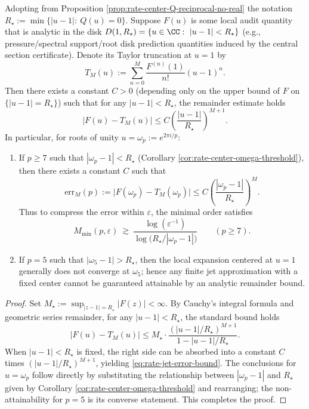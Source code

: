 \begin{proposition}\label{prop:rate-center-Rstar-jet-complexity}
Adopting from Proposition \ref{prop:rate-center-Q-reciprocal-no-real} the notation
\(
R_\star:=\min\{|u-1|:\ Q(u)=0\}
\).
Suppose \(F(u)\) is some local audit quantity that is analytic in the disk
\(
D(1,R_\star)=\{u\in\CC:\ |u-1|<R_\star\}
\)
(e.g., pressure/spectral support/root disk prediction quantities induced by the central section certificate).
Denote its Taylor truncation at \(u=1\) by
\[
T_M(u):=\sum_{n=0}^{M}\frac{F^{(n)}(1)}{n!}(u-1)^n.
\]
Then there exists a constant \(C>0\) (depending only on the upper bound of \(F\) on \(\{|u-1|=R_\star\}\)) such that for any \(|u-1|<R_\star\), the remainder estimate holds
\begin{equation}\label{eq:rate-jet-error-bound}
\boxed{\;
\bigl|F(u)-T_M(u)\bigr|
\le
C\left(\frac{|u-1|}{R_\star}\right)^{M+1}. \;}
\end{equation}
In particular, for roots of unity \(u=\omega_p:=e^{2\pi i/p}\):
\begin{enumerate}
  \item If \(p\ge 7\) such that \(|\omega_p-1|<R_\star\) (Corollary \ref{cor:rate-center-omega-threshold}), then there exists a constant \(C\) such that
  \[
  \mathrm{err}_M(p):=\bigl|F(\omega_p)-T_M(\omega_p)\bigr|
  \le
  C\left(\frac{|\omega_p-1|}{R_\star}\right)^{M}.
  \]
  Thus to compress the error within \(\varepsilon\), the minimal order satisfies
  \[
  M_{\min}(p,\varepsilon)\ \gtrsim\ \frac{\log(\varepsilon^{-1})}{\log\!\bigl(R_\star/|\omega_p-1|\bigr)}\qquad(p\ge 7).
  \]
  \item If \(p=5\) such that \(|\omega_5-1|>R_\star\), then the local expansion centered at \(u=1\) generally does not converge at \(\omega_5\); hence any finite jet approximation with a fixed center cannot be guaranteed attainable by an analytic remainder bound.
\end{enumerate}
\end{proposition}
\begin{proof}
Set \(M_\star:=\sup_{|z-1|=R_\star}|F(z)|<\infty\).
By Cauchy's integral formula and geometric series remainder, for any \(|u-1|<R_\star\), the standard bound holds
\[
\bigl|F(u)-T_M(u)\bigr|
\le
M_\star\cdot \frac{(|u-1|/R_\star)^{M+1}}{1-|u-1|/R_\star}.
\]
When \(|u-1|<R_\star\) is fixed, the right side can be absorbed into a constant \(C\) times \((|u-1|/R_\star)^{M+1}\), yielding \eqref{eq:rate-jet-error-bound}.
The conclusions for \(u=\omega_p\) follow directly by substituting the relationship between \(|\omega_p-1|\) and \(R_\star\) given by Corollary \ref{cor:rate-center-omega-threshold} and rearranging; the non-attainability for \(p=5\) is its converse statement. This completes the proof.
\end{proof}

